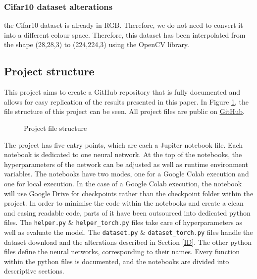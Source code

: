 \documentclass[conference]{IEEEtran}
\begin{document}
\subsubsection{Cifar10 dataset alterations}
the Cifar10 dataset is already in RGB. Therefore, we do not need to convert it into a different colour space. 
Therefore, this dataset has been interpolated from the shape (28,28,3) to (224,224,3) using the OpenCV library.

\subsection{Project structure}
This project aims to create a GitHub repository that is fully documented and allows for easy replication of the results presented in this paper. 
In Figure \ref{dir: file strucutre}, the file structure of this project can be seen.
All project files are public on \href{https://github.com/devasworski/Deeper-Networks-for-Image-Classification}{GitHub}.

\begin{figure}[!htbp]
\caption{Project file structure}
\label{dir: file strucutre}
\end{figure}

The project has five entry points, which are each a Jupiter notebook file. 
Each notebook is dedicated to one neural network.
At the top of the notebooks, the hyperparameters of the network can be adjusted as well as runtime environment variables.
The notebooks have two modes, one for a Google Colab execution and one for local execution.
In the case of a Google Colab execution, the notebook will use Google Drive for checkpoints rather than the checkpoint folder within the project.
In order to minimise the code within the notebooks and create a clean and easing readable code, parts of it have been outsourced into dedicated python files.
The \verb|helper.py| \& \verb|helper_torch.py| files take care of hyperparameters as well as evaluate the model. 
The \verb|dataset.py| \& \verb|dataset_torch.py| files handle the dataset download and the alterations described in Section \ref{ID}.
The other python files define the neural networks, corresponding to their names. Every function within the python files is documented, and the notebooks are divided into descriptive sections.
\end{document}
